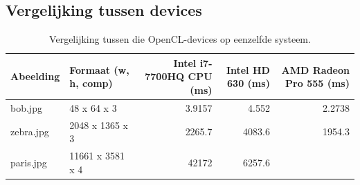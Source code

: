 \documentclass[twocolumn, a4paper]{article}
\begin{document}
\subsection{Vergelijking tussen devices}

\begin{table}[]
    \centering
    \caption{Vergelijking tussen die OpenCL-devices op eenzelfde systeem.}
    \label{table:measurements}
    \begin{tabular}{@{}llrrr@{}}
        \toprule
        Abeelding & Formaat (w, h, comp) & Intel i7-7700HQ CPU {(}ms{)} & Intel HD 630 {(}ms{)} & AMD Radeon Pro 555 {(}ms{)} \\ \midrule
        bob.jpg   & 48 x 64 x 3              & 3.9157                       & 4.552                 & 2.2738                      \\
        zebra.jpg & 2048 x 1365 x 3      & 2265.7                       & 4083.6                & 1954.3                      \\
        paris.jpg & 11661 x 3581 x 4 & 42172 & 6257.6 \\ \bottomrule
    \end{tabular}
\end{table}
\end{document}
